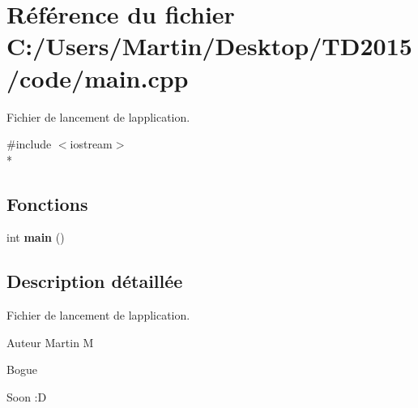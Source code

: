 \section{Référence du fichier C\+:/\+Users/\+Martin/\+Desktop/\+T\+D2015/code/main.cpp}
\label{main_8cpp}


Fichier de lancement de l\textquotesingle{}application.  


{\ttfamily \#include $<$iostream$>$}\\*
\subsection*{Fonctions}
\begin{DoxyCompactItemize}
\item 
int {\bfseries main} ()\label{main_8cpp_ae66f6b31b5ad750f1fe042a706a4e3d4}

\end{DoxyCompactItemize}


\subsection{Description détaillée}
Fichier de lancement de l\textquotesingle{}application. 

\begin{DoxyAuthor}{Auteur}
Martin M 
\end{DoxyAuthor}
\begin{DoxyRefDesc}{Bogue}
\item[{\bf Bogue}]Soon \+:D \end{DoxyRefDesc}

